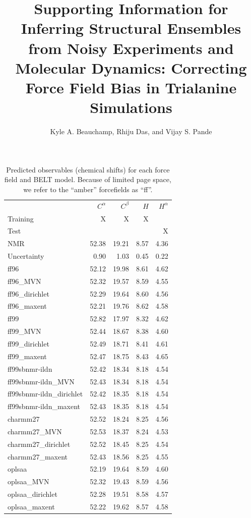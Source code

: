 \documentclass[12pt]{article}
\author{Kyle A. Beauchamp,   Rhiju Das,  and Vijay S. Pande}
\title{Supporting Information for Inferring Structural Ensembles from Noisy Experiments and Molecular Dynamics: Correcting Force Field Bias in Trialanine Simulations}
\begin{document}
\maketitle


\newpage

\begin{table}
 
\begin{tabular}{lrrrr}
\toprule
  &    $C^\alpha$ &    $C^\beta$ &    $H$ &   $H^\alpha$ \\
Training & X & X & X & \\                    
Test & &  & & X \\
NMR                         & 52.38 & 19.21 & 8.57 & 4.36 \\
Uncertainty                 &  0.90 &  1.03 & 0.45 & 0.22 \\

\toprule
ff96                     & 52.12 & 19.98 & 8.61 & 4.62 \\
ff96\_MVN                 & 52.32 & 19.57 & 8.59 & 4.55 \\
ff96\_dirichlet           & 52.29 & 19.64 & 8.60 & 4.56 \\
ff96\_maxent              & 52.21 & 19.76 & 8.62 & 4.58 \\
\toprule
ff99                     & 52.82 & 17.97 & 8.32 & 4.62 \\
ff99\_MVN                 & 52.44 & 18.67 & 8.38 & 4.60 \\
ff99\_dirichlet           & 52.49 & 18.71 & 8.41 & 4.61 \\
ff99\_maxent              & 52.47 & 18.75 & 8.43 & 4.65 \\
\toprule
ff99sbnmr-ildn           & 52.42 & 18.34 & 8.18 & 4.54 \\
ff99sbnmr-ildn\_MVN       & 52.43 & 18.34 & 8.18 & 4.54 \\
ff99sbnmr-ildn\_dirichlet & 52.42 & 18.35 & 8.18 & 4.54 \\
ff99sbnmr-ildn\_maxent    & 52.43 & 18.35 & 8.18 & 4.54 \\
\toprule
charmm27                    & 52.52 & 18.24 & 8.25 & 4.56 \\
charmm27\_MVN                & 52.53 & 18.37 & 8.24 & 4.53 \\
charmm27\_dirichlet          & 52.52 & 18.45 & 8.25 & 4.54 \\
charmm27\_maxent             & 52.43 & 18.56 & 8.25 & 4.55 \\
\toprule
oplsaa                      & 52.19 & 19.64 & 8.59 & 4.60 \\
oplsaa\_MVN                  & 52.32 & 19.43 & 8.59 & 4.56 \\
oplsaa\_dirichlet            & 52.28 & 19.51 & 8.58 & 4.57 \\
oplsaa\_maxent               & 52.22 & 19.62 & 8.57 & 4.58 \\
\bottomrule


\end{tabular}
\caption{
Predicted observables (chemical shifts) for each force field and BELT model.  Because of limited page space, we refer to the ``amber'' forcefields as ``ff''.  
}
\end{table}
\newpage
\end{document}
